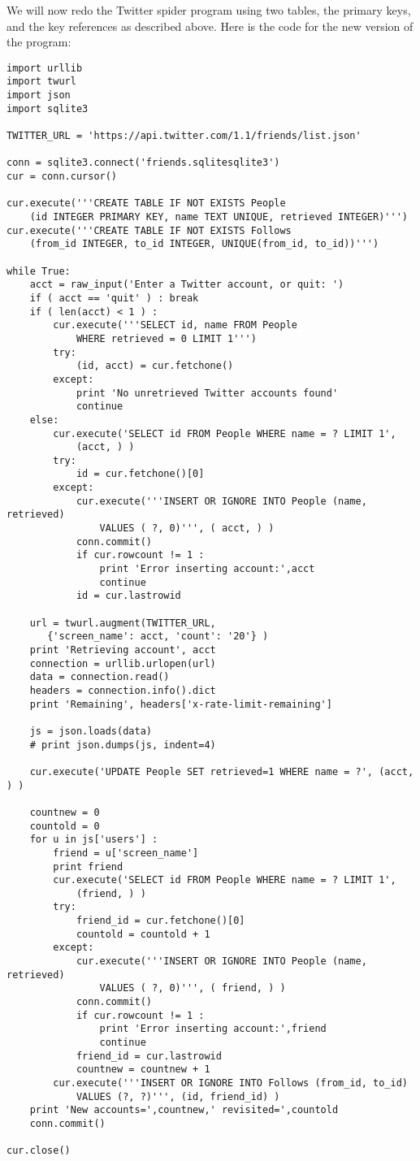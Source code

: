 We will now redo the Twitter spider program using two tables, the primary
keys, and the key references as described above.  Here is the code for 
the new version of the program:

\beforeverb
\begin{verbatim}
import urllib
import twurl
import json
import sqlite3

TWITTER_URL = 'https://api.twitter.com/1.1/friends/list.json'

conn = sqlite3.connect('friends.sqlitesqlite3')
cur = conn.cursor()

cur.execute('''CREATE TABLE IF NOT EXISTS People 
    (id INTEGER PRIMARY KEY, name TEXT UNIQUE, retrieved INTEGER)''')
cur.execute('''CREATE TABLE IF NOT EXISTS Follows 
    (from_id INTEGER, to_id INTEGER, UNIQUE(from_id, to_id))''')

while True:
    acct = raw_input('Enter a Twitter account, or quit: ')
    if ( acct == 'quit' ) : break
    if ( len(acct) < 1 ) :
        cur.execute('''SELECT id, name FROM People 
            WHERE retrieved = 0 LIMIT 1''')
        try:
            (id, acct) = cur.fetchone()
        except:
            print 'No unretrieved Twitter accounts found'
            continue
    else:
        cur.execute('SELECT id FROM People WHERE name = ? LIMIT 1', 
            (acct, ) )
        try:
            id = cur.fetchone()[0]
        except:
            cur.execute('''INSERT OR IGNORE INTO People (name, retrieved) 
                VALUES ( ?, 0)''', ( acct, ) )
            conn.commit()
            if cur.rowcount != 1 : 
                print 'Error inserting account:',acct
                continue
            id = cur.lastrowid

    url = twurl.augment(TWITTER_URL, 
       {'screen_name': acct, 'count': '20'} )
    print 'Retrieving account', acct
    connection = urllib.urlopen(url)
    data = connection.read()
    headers = connection.info().dict
    print 'Remaining', headers['x-rate-limit-remaining']

    js = json.loads(data)
    # print json.dumps(js, indent=4)

    cur.execute('UPDATE People SET retrieved=1 WHERE name = ?', (acct, ) )

    countnew = 0
    countold = 0
    for u in js['users'] :
        friend = u['screen_name']
        print friend
        cur.execute('SELECT id FROM People WHERE name = ? LIMIT 1', 
            (friend, ) )
        try:
            friend_id = cur.fetchone()[0]
            countold = countold + 1
        except:
            cur.execute('''INSERT OR IGNORE INTO People (name, retrieved) 
                VALUES ( ?, 0)''', ( friend, ) )
            conn.commit()
            if cur.rowcount != 1 :
                print 'Error inserting account:',friend
                continue
            friend_id = cur.lastrowid
            countnew = countnew + 1
        cur.execute('''INSERT OR IGNORE INTO Follows (from_id, to_id) 
            VALUES (?, ?)''', (id, friend_id) )
    print 'New accounts=',countnew,' revisited=',countold
    conn.commit()

cur.close()
\end{verbatim}
